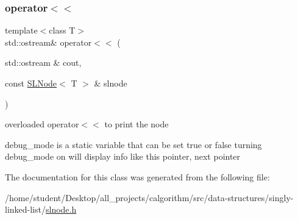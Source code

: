 \subsubsection{\texorpdfstring{operator$<$$<$}{operator<<}}
{\footnotesize\ttfamily template$<$class T$>$ \\
std\+::ostream\& operator$<$$<$ (\begin{DoxyParamCaption}\item[{std\+::ostream \&}]{cout,  }\item[{const \mbox{\hyperlink{classSLNode}{S\+L\+Node}}$<$ T $>$ \&}]{slnode }\end{DoxyParamCaption})\hspace{0.3cm}{\ttfamily [friend]}}



overloaded operator$<$$<$ to print the node 

debug\+\_\+mode is a static variable that can be set true or false turning debug\+\_\+mode on will display info like this pointer, next pointer 

The documentation for this class was generated from the following file\+:\begin{DoxyCompactItemize}
\item 
/home/student/\+Desktop/all\+\_\+projects/calgorithm/src/data-\/structures/singly-\/linked-\/list/\mbox{\hyperlink{slnode_8h}{slnode.\+h}}\end{DoxyCompactItemize}
